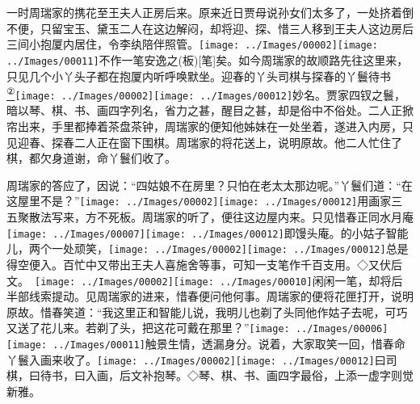 一时周瑞家的携花至王夫人正房后来。原来近日贾母说孙女们太多了，一处挤着倒不便，只留宝玉、黛玉二人在这边解闷，却将迎、探、惜三人移到王夫人这边房后三间小抱厦内居住，令李纨陪伴照管。{{\texttt{[image: ../Images/00002]}\texttt{[image: ../Images/00011]}\footnotesize \kaishu 不作一笔安逸之{(板)}{[}笔{]}矣。}}如今周瑞家的故顺路先往这里来，只见几个小丫头子都在抱厦内听呼唤默坐。迎春的丫头司棋与探春的丫鬟待书\href{../Text/part0011_split_000.html\#lnkback_2_a}{\textsuperscript{②}}{\texttt{[image: ../Images/00002]}\texttt{[image: ../Images/00012]}\footnotesize \kaishu 妙名。贾家四钗之鬟，暗以琴、棋、书、画四字列名，省力之甚，醒目之甚，却是俗中不俗处。}二人正掀帘出来，手里都捧着茶盘茶钟，周瑞家的便知他姊妹在一处坐着，遂进入内房，只见迎春、探春二人正在窗下围棋。周瑞家的将花送上，说明原故。他二人忙住了棋，都欠身道谢，命丫鬟们收了。

周瑞家的答应了，因说：``四姑娘不在房里？只怕在老太太那边呢。''丫鬟们道：``在这屋里不是？''{\texttt{[image: ../Images/00002]}\texttt{[image: ../Images/00012]}\footnotesize \kaishu 用画家三五聚散法写来，方不死板。}周瑞家的听了，便往这边屋内来。只见惜春正同水月庵{\texttt{[image: ../Images/00007]}\texttt{[image: ../Images/00012]}\footnotesize \kaishu 即馒头庵。}的小姑子智能儿，两个一处顽笑，{\texttt{[image: ../Images/00002]}\texttt{[image: ../Images/00012]}\footnotesize \kaishu 总是得空便入。百忙中又带出王夫人喜施舍等事，可知一支笔作千百支用。◇又伏后文。　\texttt{[image: ../Images/00002]}\texttt{[image: ../Images/00010]}\footnotesize \kaishu 闲闲一笔，却将后半部线索提动。}见周瑞家的进来，惜春便问他何事。周瑞家的便将花匣打开，说明原故。惜春笑道：``我这里正和智能儿说，我明儿也剃了头同他作姑子去呢，可巧又送了花儿来。若剃了头，把这花可戴在那里？''{\texttt{[image: ../Images/00006]}\texttt{[image: ../Images/00011]}\footnotesize \kaishu 触景生情，透漏身分。}说着，大家取笑一回，惜春命丫鬟入画来收了。{\texttt{[image: ../Images/00002]}\texttt{[image: ../Images/00012]}\footnotesize \kaishu 曰司棋，曰待书，曰入画，后文补抱琴。◇琴、棋、书、画四字最俗，上添一虚字则觉新雅。}

